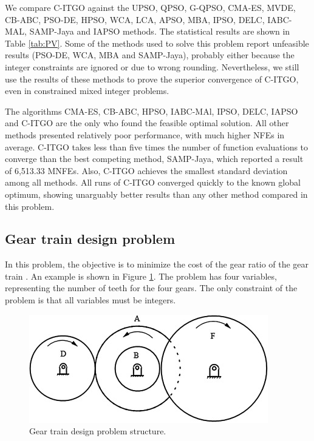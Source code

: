 

We compare C-ITGO against the UPSO, QPSO, G-QPSO, CMA-ES, MVDE, CB-ABC, PSO-DE, HPSO, WCA, LCA, APSO, MBA, IPSO, DELC, IABC-MAL, SAMP-Jaya and IAPSO methods. The statistical results are shown in Table \ref{tab:PV}. Some of the methods used to solve this problem report unfeasible results (PSO-DE, WCA, MBA and SAMP-Jaya), probably either because the integer constraints are ignored or due to wrong rounding. Nevertheless, we still use the results of these methods to prove the superior convergence of C-ITGO, even in constrained mixed integer problems.


The algorithms CMA-ES, CB-ABC, HPSO, IABC-MAl, IPSO, DELC, IAPSO and C-ITGO are the only who found the feasible optimal solution. All other methods presented relatively poor performance, with much higher NFEs in average. C-ITGO takes less than five times the number of function evaluations to converge than the best competing method, SAMP-Jaya, which reported a result of 6,513.33 MNFEs. Also, C-ITGO achieves the smallest standard deviation among all methods. All runs of C-ITGO converged quickly to the known global optimum, showing unarguably better results than any other method compared in this problem.



\subsection{Gear train design problem}

In this problem, the objective is to minimize the cost of the gear ratio of the gear train \citep{PV}. An example is shown in Figure \ref{fig:GT}. The problem has four variables, representing the number of teeth for the four gears. The only constraint of the problem is that all variables must be integers.


\begin{figure}[h]
\begin{center}
\includegraphics[scale=0.6]{Imgs/GT.jpg}
\end{center}
\captionsetup{justification=centering}
\caption{Gear train design problem structure.}\label{fig:GT}
\end{figure}


